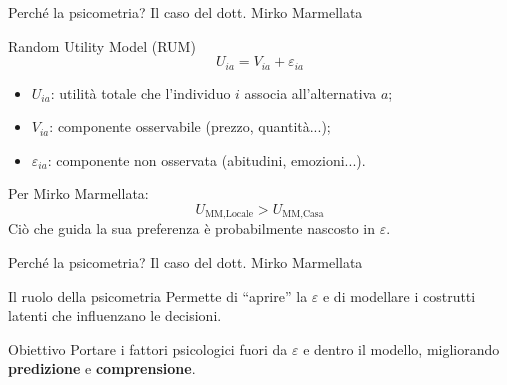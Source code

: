 \documentclass{beamer}
\begin{document}
\begin{frame}{Perché la psicometria? Il caso del dott. Mirko Marmellata}
\begin{block}{Random Utility Model (RUM)}
\[
U_{ia} = V_{ia} + \varepsilon_{ia}
\]
\begin{itemize}
  \item \(U_{ia}\): utilità totale che l’individuo \(i\) associa all’alternativa \(a\);
  \item \(V_{ia}\): componente osservabile (prezzo, quantità...);
  \item \(\varepsilon_{ia}\): componente non osservata (abitudini, emozioni...).
\end{itemize}
\end{block}
\vspace{1em}
\begin{block}{Per Mirko Marmellata:}
\[
U_{\text{MM}, \text{Locale}} > U_{\text{MM}, \text{Casa}}
\]
Ciò che guida la sua preferenza è probabilmente nascosto in \(\varepsilon\).
\end{block}
\end{frame}

\begin{frame}{Perché la psicometria? Il caso del dott. Mirko Marmellata}
\begin{block}{Il ruolo della psicometria}
Permette di ``aprire'' la \(\varepsilon\) e di modellare i costrutti latenti che influenzano le decisioni.
\end{block}
\vspace{1em}
\begin{block}{Obiettivo}
Portare i fattori psicologici fuori da \(\varepsilon\) e dentro il modello, migliorando \textbf{predizione} e \textbf{comprensione}.
\end{block}
\end{frame}
\end{document}
